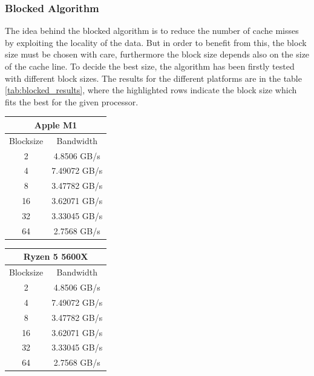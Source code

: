 \documentclass{article}
\begin{document}
\subsubsection{Blocked Algorithm}
The idea behind the blocked algorithm is to reduce the number of cache misses by exploiting the locality of the data. But in order to benefit from this, the block
size must be chosen with care, furthermore the block size depends also on the size of the cache line. To decide the best size, the algorithm has been firstly
tested with different block sizes. The results for the different platforms are in the table \ref{tab:blocked_results}, where the highlighted rows indicate the 
block size which fits the best for the given processor.
\begin{table}
    \centering
    \begin{tabular}{|c|c|}
        \hline
        \multicolumn{2}{|c|}{\textbf{Apple M1}} \\
        \hline
        Blocksize & Bandwidth \\ \hline
        2         & 4.8506 GB/s \\ \hline
        4         & 7.49072 GB/s \\ \hline
        8         & 3.47782 GB/s \\ \hline
        16        & 3.62071 GB/s \\ \hline
        32        & 3.33045 GB/s \\ \hline
        64        & 2.7568 GB/s \\ \hline
    \end{tabular}
    \hspace{2em}
    \begin{tabular}{|c|c|}
        \hline
        \multicolumn{2}{|c|}{\textbf{Ryzen 5 5600X}} \\
        \hline
        Blocksize & Bandwidth \\ \hline
        2         & 4.8506 GB/s \\ \hline
        \rowcolor{LightYellow}
        4         & 7.49072 GB/s \\ \hline
        8         & 3.47782 GB/s \\ \hline
        16        & 3.62071 GB/s \\ \hline
        32        & 3.33045 GB/s \\ \hline
        64        & 2.7568 GB/s \\ \hline
    \end{tabular}
    \hspace{2em}
    \begin{tabular}{|c|c|}

\end{tabular}
\end{table}
\end{document}
